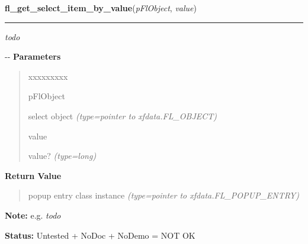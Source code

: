 \hspace{.8\funcindent}\begin{boxedminipage}{\funcwidth}

    \raggedright \textbf{fl\_get\_select\_item\_by\_value}(\textit{pFlObject}, \textit{value})

    \vspace{-1.5ex}

    \rule{\textwidth}{0.5\fboxrule}
\setlength{\parskip}{2ex}

\emph{todo}

-{}-
\setlength{\parskip}{1ex}
      \textbf{Parameters}
      \vspace{-1ex}

      \begin{quote}
        \begin{Ventry}{xxxxxxxxx}

          \item[pFlObject]


select object
            {\it (type=pointer to xfdata.FL\_OBJECT)}

          \item[value]


value?
            {\it (type=long)}

        \end{Ventry}

      \end{quote}

      \textbf{Return Value}
    \vspace{-1ex}

      \begin{quote}

popup entry class instance
      {\it (type=pointer to xfdata.FL\_POPUP\_ENTRY)}

      \end{quote}

\textbf{Note:} 
e.g. \emph{todo}


\textbf{Status:} 
Untested + NoDoc + NoDemo = NOT OK


    \end{boxedminipage}

    \label{xformslib:flselect:fl_get_select_item_by_label}

    \vspace{0.5ex}

